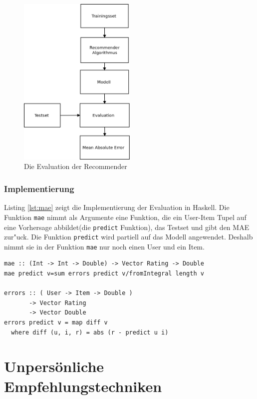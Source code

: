 \documentclass[a4paper, 12pt]{article}
\begin{document}
\begin{figure}
  \centering
      \includegraphics[width=0.5\textwidth]{evaluationn}
  \caption{Die Evaluation der Recommender}
  \label{fig:crossvalidation}
\end{figure}

\subsubsection{Implementierung}

Listing \ref{lst:mae} zeigt die Implementierung der Evaluation in Haskell. Die Funktion \verb|mae| nimmt als Argumente eine Funktion, die ein User-Item Tupel auf eine Vorhersage abbildet(die \verb|predict| Funktion), das Testset und gibt den MAE zur"uck. Die Funktion \verb|predict| wird partiell auf das Modell angewendet. Deshalb nimmt sie in der Funktion \verb|mae| nur noch einen User und ein Item.

\begin{lstlisting}[caption=Berechnung des MAE in Haskell , label=lst:mae]
mae :: (Int -> Int -> Double) -> Vector Rating -> Double
mae predict v=sum errors predict v/fromIntegral length v

errors :: ( User -> Item -> Double )
       -> Vector Rating
       -> Vector Double
errors predict v = map diff v
  where diff (u, i, r) = abs (r - predict u i)
\end{lstlisting}

\section{Unpersönliche Empfehlungstechniken}
\label{sec:simple}
\end{document}
